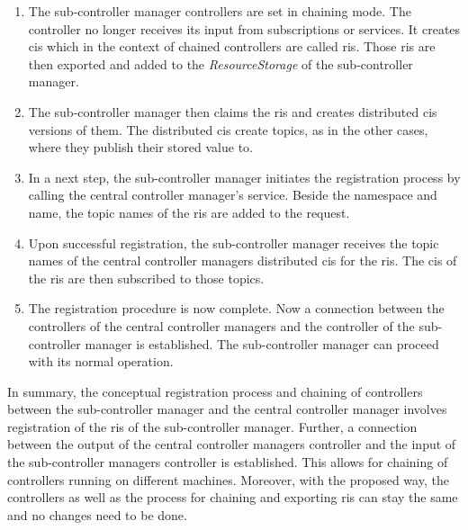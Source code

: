 \begin{enumerate}
    \item The sub-controller manager controllers are set in chaining mode. The controller no longer receives its input from subscriptions or services. It creates \glspl{ci} which in the context of chained controllers are called \glspl{ri}. Those \glspl{ri} are then exported and added to the \textit{ResourceStorage} of the sub-controller manager.

    \item The sub-controller manager then claims the \glspl{ri} and creates distributed \glspl{ci} versions of them. The distributed \glspl{ci} create topics, as in the other cases, where they publish their stored value to.
        
    \item In a next step, the sub-controller manager initiates the registration process by calling the central controller manager's service. Beside the namespace and name, the topic names of the \glspl{ri} are added to the request.

    \item Upon successful registration, the sub-controller manager receives the topic names of the central controller managers distributed \glspl{ci} for the \glspl{ri}. The \glspl{ci} of the \glspl{ri} are then subscribed to those topics.

    \item The registration procedure is now complete. Now a connection between the controllers of the central controller managers and the controller of the sub-controller manager is established. The sub-controller manager can proceed with its normal operation.

\end{enumerate}
In summary, the conceptual registration process and chaining of controllers between the sub-controller manager and the central controller manager involves registration of the \glspl{ri} of the sub-controller manager. Further, a connection between the output of the central controller managers controller and the input of the sub-controller managers controller is established. This allows for chaining of controllers running on different machines. Moreover, with the proposed way, the controllers as well as the process for chaining and exporting \glspl{ri} can stay the same and no changes need to be done.
